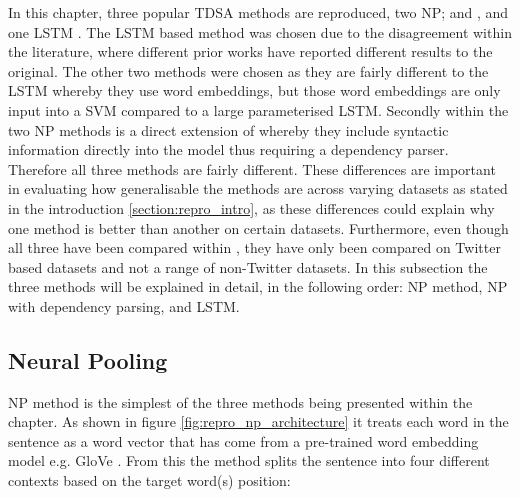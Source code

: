 In this chapter, three popular TDSA methods are reproduced, two NP; \citet{vo2015target} and \citet{wang-etal-2017-tdparse}, and one LSTM \citet{tang-etal-2016-effective}. The LSTM based method was chosen due to the disagreement within the literature, where different prior works have reported different results to the original. The other two methods were chosen as they are fairly different to the LSTM whereby they use word embeddings, but those word embeddings are only input into a SVM compared to a large parameterised LSTM. Secondly within the two NP methods \citet{wang-etal-2017-tdparse} is a direct extension of \citet{vo2015target} whereby they include syntactic information directly into the model thus requiring a dependency parser. Therefore all three methods are fairly different. These differences are important in evaluating how generalisable the methods are across varying datasets as stated in the introduction \ref{section:repro_intro}, as these differences could explain why one method is better than another on certain datasets. Furthermore, even though all three have been compared within \citet{wang-etal-2017-tdparse}, they have only been compared on Twitter based datasets and not a range of non-Twitter datasets. In this subsection the three methods will be explained in detail, in the following order: \citet{vo2015target} NP method, \citet{wang-etal-2017-tdparse} NP with dependency parsing, and \citet{tang-etal-2016-effective} LSTM. 





\subsection{Neural Pooling}
\citet{vo2015target} NP method is the simplest of the three methods being presented within the chapter. As shown in figure \ref{fig:repro_np_architecture} it treats each word in the sentence as a word vector that has come from a pre-trained word embedding model e.g. GloVe \citep{pennington-etal-2014-glove}. From this the method splits the sentence into four different contexts based on the target word(s) position:

